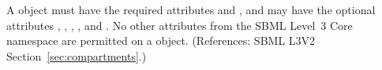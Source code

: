 A \Compartment object must have the required attributes  and
, and may have the optional attributes ,
, , ,  and
.  No other attributes from the SBML Level~3 Core namespace
are permitted on a \Compartment object.  (References: SBML L3V2
Section~\ref{sec:compartments}.)
